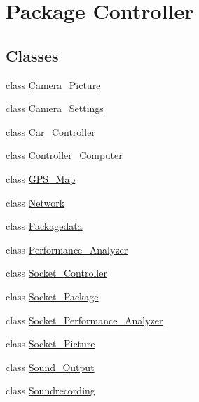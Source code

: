 \hypertarget{namespace_controller}{}\section{Package Controller}
\label{namespace_controller}
\subsection*{Classes}
\begin{DoxyCompactItemize}
\item 
class \hyperlink{class_controller_1_1_camera___picture}{Camera\+\_\+\+Picture}
\item 
class \hyperlink{class_controller_1_1_camera___settings}{Camera\+\_\+\+Settings}
\item 
class \hyperlink{class_controller_1_1_car___controller}{Car\+\_\+\+Controller}
\item 
class \hyperlink{class_controller_1_1_controller___computer}{Controller\+\_\+\+Computer}
\item 
class \hyperlink{class_controller_1_1_g_p_s___map}{G\+P\+S\+\_\+\+Map}
\item 
class \hyperlink{class_controller_1_1_network}{Network}
\item 
class \hyperlink{class_controller_1_1_packagedata}{Packagedata}
\item 
class \hyperlink{class_controller_1_1_performance___analyzer}{Performance\+\_\+\+Analyzer}
\item 
class \hyperlink{class_controller_1_1_socket___controller}{Socket\+\_\+\+Controller}
\item 
class \hyperlink{class_controller_1_1_socket___package}{Socket\+\_\+\+Package}
\item 
class \hyperlink{class_controller_1_1_socket___performance___analyzer}{Socket\+\_\+\+Performance\+\_\+\+Analyzer}
\item 
class \hyperlink{class_controller_1_1_socket___picture}{Socket\+\_\+\+Picture}
\item 
class \hyperlink{class_controller_1_1_sound___output}{Sound\+\_\+\+Output}
\item 
class \hyperlink{class_controller_1_1_soundrecording}{Soundrecording}
\end{DoxyCompactItemize}
